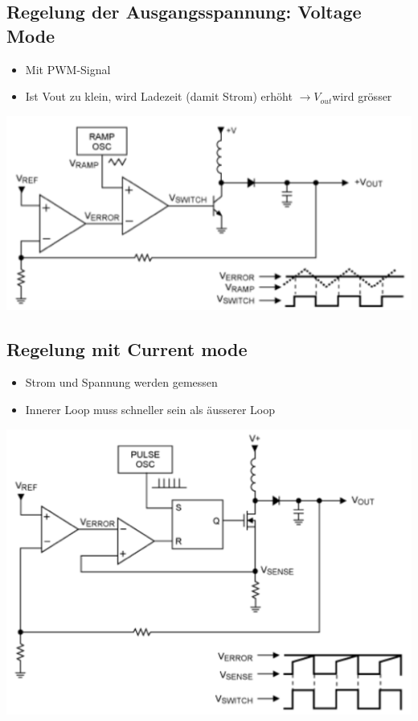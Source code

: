 \begin{multicols}{2}
\subsection{Regelung der Ausgangsspannung: Voltage Mode}
\begin{itemize}
  \item Mit PWM-Signal
  \item Ist Vout zu klein, wird Ladezeit (damit Strom) erhöht $\to V_{out}$wird
  grösser
\end{itemize}

\includegraphics[width=\linewidth]{images/ausgangsspannungsregelung}
\vfill\null
\columnbreak
\subsection{Regelung mit Current mode}
\begin{itemize}
	\item Strom und Spannung werden gemessen
	\item Innerer Loop muss schneller sein als äusserer Loop
\end{itemize}

\includegraphics[width=\linewidth]{images/currentmode}
\end{multicols}
